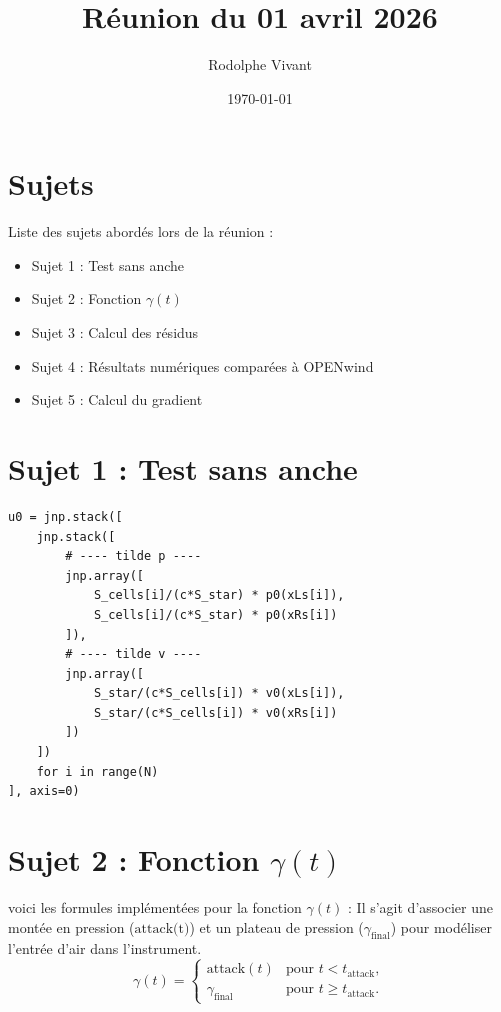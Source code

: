 \documentclass[12pt,a4paper]{article}
\title{Réunion du 01 avril 2026}
\author{Rodolphe Vivant}
\date{\today}
\begin{document}
\maketitle

\section{Sujets}
Liste des sujets abordés lors de la réunion :
\begin{itemize}
    \item Sujet 1 : Test sans anche
    \item Sujet 2 : Fonction $\gamma(t)$
    \item Sujet 3 : Calcul des résidus
    \item Sujet 4 : Résultats numériques comparées à OPENwind 
    \item Sujet 5 : Calcul du gradient
\end{itemize}

\section{Sujet 1 : Test sans anche}

\begin{verbatim}
u0 = jnp.stack([
    jnp.stack([
        # ---- tilde p ----
        jnp.array([
            S_cells[i]/(c*S_star) * p0(xLs[i]),
            S_cells[i]/(c*S_star) * p0(xRs[i])
        ]),
        # ---- tilde v ----
        jnp.array([
            S_star/(c*S_cells[i]) * v0(xLs[i]),
            S_star/(c*S_cells[i]) * v0(xRs[i])
        ])
    ])
    for i in range(N)
], axis=0)
\end{verbatim}

\section{Sujet 2 : Fonction $\gamma(t)$}

voici les formules implémentées pour la fonction $\gamma(t)$ :
Il s'agit d'associer une montée en pression ($\text{attack(t)}$) et un plateau de pression ($\gamma_{\text{final}}$) pour modéliser l'entrée d'air dans l'instrument.
\begin{equation}
    \gamma(t) =
    \begin{cases}
        \text{attack}(t) & \text{pour } t < t_{\text{attack}}, \\
        \gamma_{\text{final}} & \text{pour } t \geq t_{\text{attack}}.
    \end{cases}
\end{equation}
\end{document}
